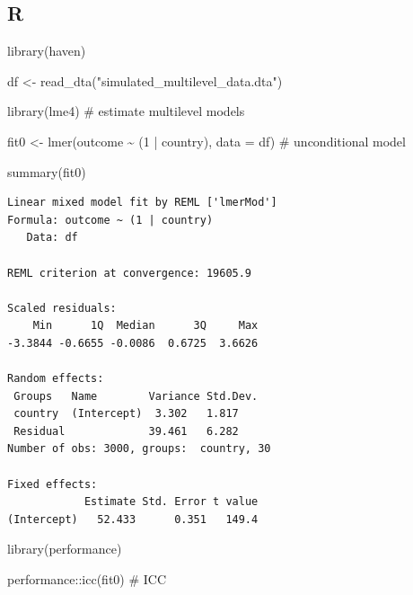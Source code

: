 \documentclass[
  letterpaper,
  DIV=11,
  numbers=noendperiod]{scrreprt}
\newenvironment{Shaded}{\begin{snugshade}}{\end{snugshade}}
\newcommand{\AttributeTok}[1]{\textcolor[rgb]{0.40,0.45,0.13}{#1}}
\newcommand{\CommentTok}[1]{\textcolor[rgb]{0.37,0.37,0.37}{#1}}
\newcommand{\DecValTok}[1]{\textcolor[rgb]{0.68,0.00,0.00}{#1}}
\newcommand{\FunctionTok}[1]{\textcolor[rgb]{0.28,0.35,0.67}{#1}}
\newcommand{\NormalTok}[1]{\textcolor[rgb]{0.00,0.23,0.31}{#1}}
\newcommand{\OtherTok}[1]{\textcolor[rgb]{0.00,0.23,0.31}{#1}}
\newcommand{\SpecialCharTok}[1]{\textcolor[rgb]{0.37,0.37,0.37}{#1}}
\newcommand{\StringTok}[1]{\textcolor[rgb]{0.13,0.47,0.30}{#1}}
\begin{document}
\subsection{R}

\begin{Shaded}
\begin{Highlighting}[]
\FunctionTok{library}\NormalTok{(haven)}

\NormalTok{df }\OtherTok{\textless{}{-}} \FunctionTok{read\_dta}\NormalTok{(}\StringTok{"simulated\_multilevel\_data.dta"}\NormalTok{)}
\end{Highlighting}
\end{Shaded}

\begin{Shaded}
\begin{Highlighting}[]
\FunctionTok{library}\NormalTok{(lme4) }\CommentTok{\# estimate multilevel models}

\NormalTok{fit0 }\OtherTok{\textless{}{-}} \FunctionTok{lmer}\NormalTok{(outcome }\SpecialCharTok{\textasciitilde{}}\NormalTok{ (}\DecValTok{1} \SpecialCharTok{|}\NormalTok{ country),}
             \AttributeTok{data =}\NormalTok{ df) }\CommentTok{\# unconditional model}

\FunctionTok{summary}\NormalTok{(fit0)}
\end{Highlighting}
\end{Shaded}

\begin{verbatim}
Linear mixed model fit by REML ['lmerMod']
Formula: outcome ~ (1 | country)
   Data: df

REML criterion at convergence: 19605.9

Scaled residuals: 
    Min      1Q  Median      3Q     Max 
-3.3844 -0.6655 -0.0086  0.6725  3.6626 

Random effects:
 Groups   Name        Variance Std.Dev.
 country  (Intercept)  3.302   1.817   
 Residual             39.461   6.282   
Number of obs: 3000, groups:  country, 30

Fixed effects:
            Estimate Std. Error t value
(Intercept)   52.433      0.351   149.4
\end{verbatim}

\begin{Shaded}
\begin{Highlighting}[]
\FunctionTok{library}\NormalTok{(performance)}

\NormalTok{performance}\SpecialCharTok{::}\FunctionTok{icc}\NormalTok{(fit0) }\CommentTok{\# ICC}
\end{Highlighting}
\end{Shaded}
\end{document}
